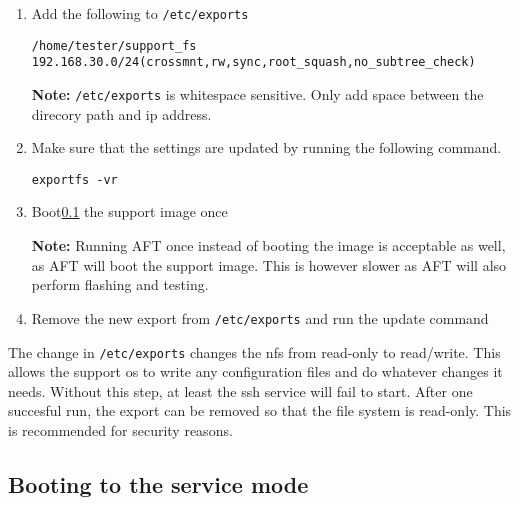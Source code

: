 \documentclass[a4paper,11pt]{article}
\newcommand{\note}{\textbf{Note: }}
\newcommand{\cmd}[1]{\texttt{#1}}
\begin{document}
\begin{enumerate}
\item Add the following to \cmd{/etc/exports}

\begin{lstlisting}
/home/tester/support_fs 192.168.30.0/24(crossmnt,rw,sync,root_squash,no_subtree_check) 
\end{lstlisting}

\note \cmd{/etc/exports} is whitespace sensitive. Only add space between the direcory path and ip address.

\item Make sure that the settings are updated by running the following command.

\begin{lstlisting}
exportfs -vr
\end{lstlisting}

\item Boot\ref{bbbboot} the support image once

\note Running AFT once instead of booting the image is acceptable as well, as AFT will boot the support image. This is however slower as AFT will also perform flashing and testing.

\item Remove the new export from \cmd{/etc/exports} and run the update command

\end{enumerate}


The change in \cmd{/etc/exports} changes the nfs from read-only to read/write. This allows the support os to write any configuration files and do whatever changes it needs. Without this step, at least the ssh service will fail to start. After one succesful run, the export can be removed so that the file system is read-only. This is recommended for security reasons.

\subsection{Booting to the service mode}
\label{bbbboot}
\end{document}
